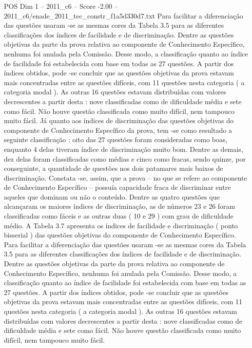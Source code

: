 \begin{textsample}{POS Dim 1 – 2011\_c6 – Score -2.00 – 2011\_c6/enade\_2011\_tec\_constr\_f1a5d330d7.txt}
Para facilitar a diferenciação das questões usaram -se as mesmas cores da Tabela 3.5 para as diferentes classificações dos índices de facilidade e de discriminação.
Dentre as questões objetivas da parte da prova relativa ao componente de Conhecimento Específico, nenhuma foi anulada pela Comissão.
Desse modo, a classificação quanto ao índice de facilidade foi estabelecida com base em todas as 27 questões.
A partir dos índices obtidos, pode -se concluir que as questões objetivas da prova estavam mais concentradas entre as questões difíceis, com 11 questões nesta categoria ( a categoria modal ).
As outras 16 questões estavam distribuídas com valores decrescentes a partir desta : nove classificadas como de dificuldade média e sete como fácil.
Não houve questão classificada como muito difícil, nem tampouco muito fácil.
Já quanto aos índices de discriminação das questões objetivas do componente de Conhecimento Específico da prova, tem -se como resultado a seguinte classificação : oito das 27 questões foram consideradas como boas, enquanto 4 delas tiveram índice de discriminação muito bom.
Dentre as demais, dez delas foram classificadas como médias e cinco como fracas, sendo quinze, por conseguinte, a quantidade de questões nos dois patamares mais baixos de discriminação.
Constata -se, assim, que a prova – no que se refere ao componente de Conhecimento Específico – possuía capacidade fraca de discriminar entre aqueles que dominam ou não o conteúdo.
Dentre as quatro questões que alcançaram os maiores índices de discriminação, as de números 23 e 26 foram classificadas como fáceis e as outras duas ( 10 e 29 ) com grau de dificuldade médio.
A Tabela 3.7 apresenta os índices de facilidade e discriminação ( ponto bisserial ) das questões objetivas do componente de Conhecimento Específico.
Para facilitar a diferenciação das questões usaram -se as mesmas cores da Tabela 3.5 para as diferentes classificações dos índices de facilidade e de discriminação.
Dentre as questões objetivas da parte da prova relativa ao componente de Conhecimento Específico, nenhuma foi anulada pela Comissão.
Desse modo, a classificação quanto ao índice de facilidade foi estabelecida com base em todas as 27 questões.
A partir dos índices obtidos, pode -se concluir que as questões objetivas da prova estavam mais concentradas entre as questões difíceis, com 11 questões nesta categoria ( a categoria modal ).
As outras 16 questões estavam distribuídas com valores decrescentes a partir desta : nove classificadas como de dificuldade média e sete como fácil.
Não houve questão classificada como muito difícil, nem tampouco muito fácil.

\end{textsample}
